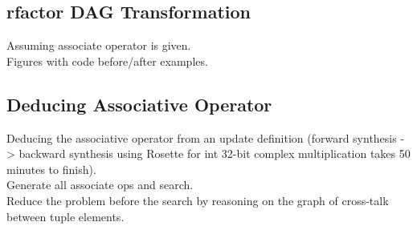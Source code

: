 \subsection{rfactor DAG Transformation}
Assuming associate operator is given. \\
Figures with code before/after examples.

\subsection{Deducing Associative Operator}
Deducing the associative operator from an update definition (forward synthesis -> backward synthesis using Rosette for int 32-bit complex multiplication takes 50 minutes to finish). \\
Generate all associate ops and search. \\
Reduce the problem before the search by reasoning on the graph of cross-talk between tuple elements. \\